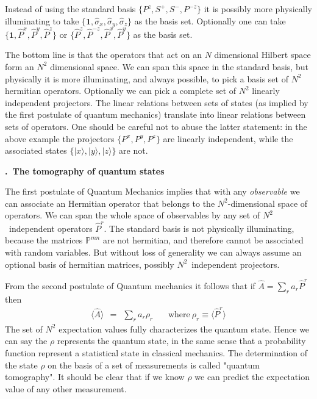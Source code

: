 \documentclass[onecolumn,fleqn, 11pt]{revtex4}
\newcommand{\beq}{\begin{eqnarray}}
\newcommand{\eeq}{\end{eqnarray}}
\renewcommand{\thesubsection}{\arabic{subsection}}
\renewcommand{\thesubsubsection}{\arabic{subsubsection}}
\newcommand{\sheadC}[1]
{
\addtocounter{subsubsection}{1}
\vspace{5mm}
{\bf \thesubsection.\thesubsubsection \ #1}  
\nopagebreak
\phantomsection
}
\begin{document}
Instead of using the standard basis ${ \{P^{z},S^{+},S^{-},P^{-z}\} }$  
it is possibly more physically illuminating  
to take ${\{\bm{1},\hat{\sigma}_x, \hat{\sigma}_y, \hat{\sigma}_z\}}$ as the basis set. 
Optionally one can take ${\{\bm{1},\hat{P}^x, \hat{P}^y, \hat{P}^z\}}$ 
or ${ \{ \hat{P}^z, \hat{P}^{-z} ,\hat{P}^x, \hat{P}^y \}}$ as the basis set. 

The bottom line is that the operators that act on an $N$ dimensional Hilbert space  
form an $N^2$ dimensional space. We can span this space in the standard basis, 
but physically it is more illuminating, and always possible, to pick a basis set of $N^2$ hermitian operators. 
Optionally we can pick a complete set of $N^2$ linearly independent projectors. 
The linear relations between sets of states (as implied by the first postulate of quantum mechanics)   
translate into linear relations between sets of operators.
One should be careful not to abuse the latter statement: 
in the above example the projectors ${ \{ P^x, P^y, P^z \} }$ are linearly independent, 
while the associated states ${ \{ |x\rangle, |y\rangle, |z\rangle \} }$ are not. 



\sheadC{The tomography of quantum states}

The first postulate of Quantum Mechanics implies that 
with any {\em observable} we can associate an Hermitian 
operator that belongs to the $N^2$-dimensional space of operators.
We can span the whole space of observables 
by any set of $N^2$~independent operators $\hat{P}^r$. 
The standard basis is not physically illuminating,  
because the matrices $\mathbb{P}^{mn}$ are not hermitian, 
and therefore cannot be associated with random variables. 
But without loss of generality we can 
always assume an optional basis of hermitian matrices, 
possibly $N^2$~independent projectors. 

From the second postulate of Quantum mechanics 
it follows that if ${\hat{A}=\sum_r a_r \hat{P}^r}$ then 
\beq
\langle\hat{A}\rangle \ \ = \ \ \sum_r a_r \rho_r  
\ \ \ \ \ \ \ \ \mbox{where} \ \rho_r \equiv \langle\hat{P}^r\rangle
\eeq
The set of $N^2$ expectation values fully characterizes the quantum state. 
Hence we can say the $\rho$ represents the quantum state, 
in the same sense that a probability function represent 
a statistical state in classical mechanics.  
The determination of the state $\rho$ on the basis of a set 
of measurements is called "quantum tomography".
It should be clear that if we know $\rho$ we can predict the 
expectation value of any other measurement. 
\end{document}
